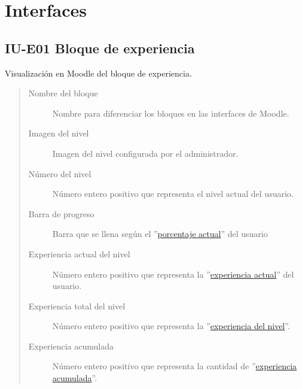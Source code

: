 

\clearpage

\section{Interfaces}

\subsection*{IU-E01 Bloque de experiencia}
\label{IUE01}

    Visualización en Moodle del bloque de experiencia.


    \begin{quote}
    \begin{description}
    	\item[Nombre del bloque] Nombre para diferenciar los bloques en las interfaces de Moodle.
    	\item[Imagen del nivel] Imagen del nivel configurada por el administrador.
    	\item[Número del nivel] Número entero positivo que representa el nivel actual del usuario.
    	\item[Barra de progreso] Barra que se llena según el ''\hyperref[table:METerminosExperiencia1]{porcentaje actual}'' del usuario
    	\item[Experiencia actual del nivel] Número entero positivo que representa la ''\hyperref[table:METerminosExperiencia1]{experiencia actual}'' del usuario.
    	\item[Experiencia total del nivel] Número entero positivo que representa la ''\hyperref[table:METerminosExperiencia1]{experiencia del nivel}''.
    	\item[Experiencia acumulada] Número entero positivo que representa la cantidad de ''\hyperref[table:METerminosExperiencia1]{experiencia acumulada}''.
    \end{description}
    \end{quote}
	\clearpage

